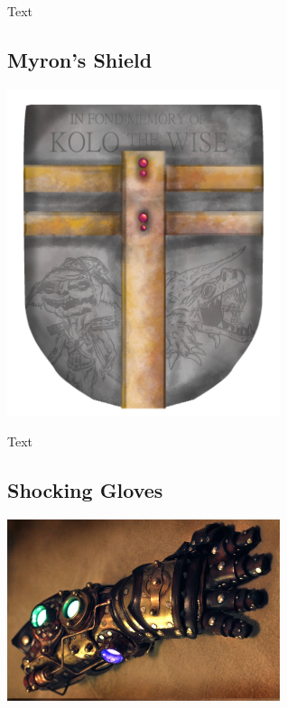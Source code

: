 \noindent 

Text

\smallskip



\subsection*{Myron's Shield} 

\begin{center}
\includegraphics[width=80mm]{./content/img/koloShield.png}
\begin{figure}[h]
\end{figure}
\end{center}

\noindent 

Text

\smallskip



\subsection*{Shocking Gloves} 

\begin{center}
\includegraphics[width=80mm]{./content/img/gloves.jpg}
\begin{figure}[h]
\end{figure}
\end{center}

